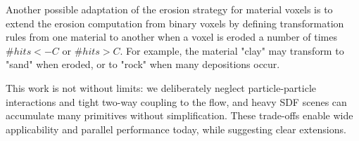 Another possible adaptation of the erosion strategy for material voxels is to extend the erosion computation from binary voxels by defining transformation rules from one material to another when a voxel is eroded a number of times $\#hits < -C$ or $\#hits > C$. For example, the material "clay" may transform to "sand" when eroded, or to "rock" when many depositions occur.


This work is not without limits: we deliberately neglect particle-particle interactions and tight two-way coupling to the flow, and heavy SDF scenes can accumulate many primitives without simplification. These trade-offs enable wide applicability and parallel performance today, while suggesting clear extensions.